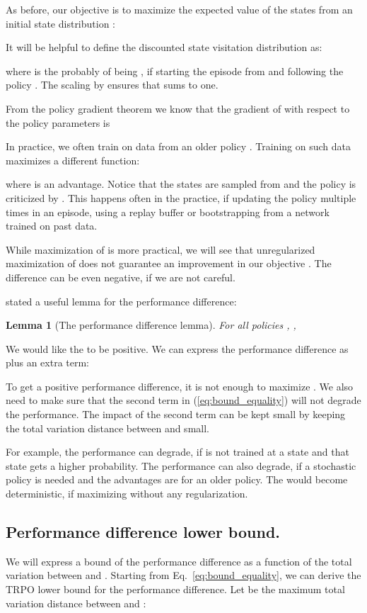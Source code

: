 \documentclass{article}
\newtheorem{lemma}[theorem]{Lemma}
\begin{document}
As before, our objective is to maximize the expected value of the states from an initial state distribution :


It will be helpful to define the discounted state visitation distribution  as:

where  is the probably of  being , if starting the episode from  and following the policy .
The scaling by  ensures that  sums to one.

From the policy gradient theorem \citep{sutton2000} we know that the gradient of  with respect to the policy parameters is


In practice, we often train on data from an older policy . Training on such data maximizes a different function:

where  is an advantage.
Notice that the states are sampled from  and the policy is criticized by . This happens often in the practice, if updating the policy multiple times in an episode, using a replay buffer or bootstrapping from a network trained on past data.

While maximization of  is more practical, we will see that unregularized maximization of  does not guarantee an improvement in our objective . The  difference can be even negative, if we are not careful.

\citet{kakade2002approximately} stated a useful lemma for the performance difference:
\begin{lemma}[The performance difference lemma] For all policies , ,

\end{lemma}

We would like the  to be positive.
We can express the performance difference as
 plus an extra term:


To get a positive  performance difference,
it is not enough to maximize .
We also need to make sure that the second term in (\ref{eq:bound_equality}) will not degrade the performance.
The impact of the second term can be kept small by keeping the total variation distance  between  and  small.

For example, the performance can degrade, if  is not trained at a state
and that state gets a higher  probability.
The performance can also degrade, if a stochastic policy is needed and the  advantages are for an older policy. The  would become deterministic, if maximizing  without any regularization.

\subsection{Performance difference lower bound.}
We will express a bound of the performance difference as a function of the total variation between  and . 
Starting from Eq.~\ref{eq:bound_equality}, we can derive the TRPO lower bound for the performance difference. Let  be the maximum total variation distance between  and :
\end{document}

